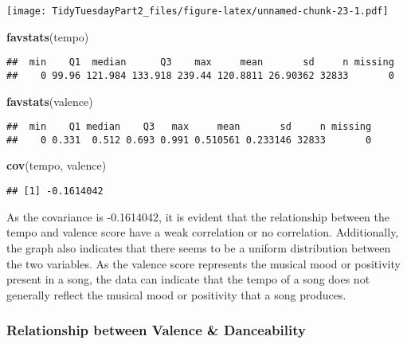 \documentclass[
]{article}
\newenvironment{Shaded}{\begin{snugshade}}{\end{snugshade}}
\newcommand{\KeywordTok}[1]{\textcolor[rgb]{0.13,0.29,0.53}{\textbf{#1}}}
\newcommand{\NormalTok}[1]{#1}
\begin{document}
\texttt{[image: TidyTuesdayPart2\_files/figure-latex/unnamed-chunk-23-1.pdf]}

\begin{Shaded}
\begin{Highlighting}[]
\KeywordTok{favstats}\NormalTok{(tempo)}
\end{Highlighting}
\end{Shaded}

\begin{verbatim}
##  min    Q1  median      Q3    max     mean       sd     n missing
##    0 99.96 121.984 133.918 239.44 120.8811 26.90362 32833       0
\end{verbatim}

\begin{Shaded}
\begin{Highlighting}[]
\KeywordTok{favstats}\NormalTok{(valence)}
\end{Highlighting}
\end{Shaded}

\begin{verbatim}
##  min    Q1 median    Q3   max     mean       sd     n missing
##    0 0.331  0.512 0.693 0.991 0.510561 0.233146 32833       0
\end{verbatim}

\begin{Shaded}
\begin{Highlighting}[]
\KeywordTok{cov}\NormalTok{(tempo, valence)}
\end{Highlighting}
\end{Shaded}

\begin{verbatim}
## [1] -0.1614042
\end{verbatim}

As the covariance is -0.1614042, it is evident that the relationship
between the tempo and valence score have a weak correlation or no
correlation. Additionally, the graph also indicates that there seems to
be a uniform distribution between the two variables. As the valence
score represents the musical mood or positivity present in a song, the
data can indicate that the tempo of a song does not generally reflect
the musical mood or positivity that a song produces.

\hypertarget{relationship-between-valence-danceability}{%
\subsubsection{Relationship between Valence \&
Danceability}\label{relationship-between-valence-danceability}}
\end{document}
